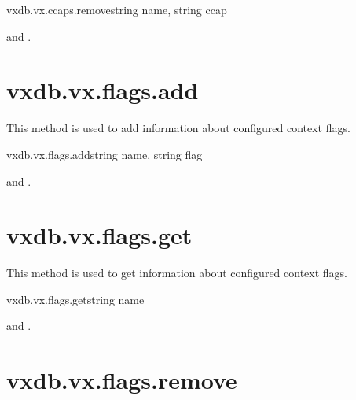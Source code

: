 \begin{rpcsynopsis}{vxdb.vx.ccaps.remove}{string name, string ccap}
\end{rpcsynopsis}

\begin{rpcaccess}
 and \rpcownerchecks.
\end{rpcaccess}

\rpcreturnnil

\rpcnoerrors


\section{vxdb.vx.flags.add}

This method is used to add information about configured context flags.

\begin{rpcsynopsis}{vxdb.vx.flags.add}{string name, string flag}
\end{rpcsynopsis}

\begin{rpcaccess}
 and \rpcownerchecks.
\end{rpcaccess}

\rpcreturnnil

\rpcnoerrors


\section{vxdb.vx.flags.get}

This method is used to get information about configured context flags.

\begin{rpcsynopsis}{vxdb.vx.flags.get}{string name}
\end{rpcsynopsis}

\begin{rpcaccess}
 and \rpcownerchecks.
\end{rpcaccess}


\rpcnoerrors


\section{vxdb.vx.flags.remove}

